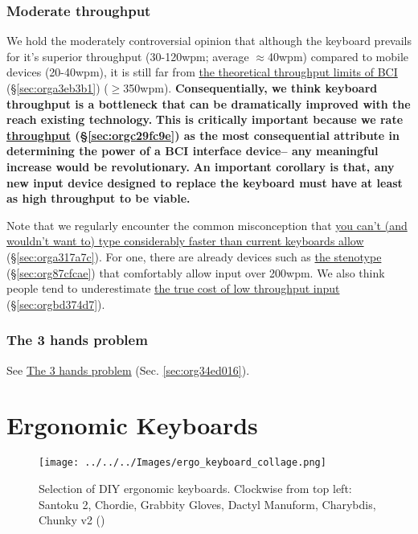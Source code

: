 \documentclass[logo,bsc,singlespacing,parskip]{infthesis}
\begin{document}
\subsubsection{Moderate throughput}
\label{sec:org878c419}
We hold the moderately controversial opinion that although the keyboard prevails for it's superior throughput (30-120wpm; average \(\approx\)40wpm) compared to mobile devices (20-40wpm), it is still far from \hyperref[sec:orga3eb3b1]{the theoretical throughput limits of BCI} (\S \ref{sec:orga3eb3b1}) (\(\ge\)350wpm).
\textbf{Consequentially, we think keyboard throughput is a bottleneck that can be dramatically improved with the reach existing technology.}
\textbf{This is critically important because we rate \hyperref[sec:orgc29fc9e]{throughput} (\S \ref{sec:orgc29fc9e}) as the most consequential attribute in determining the power of a BCI interface device-- any meaningful increase would be revolutionary.}
\textbf{An important corollary is that, any new input device designed to replace the keyboard must have at least as high throughput to be viable.}

Note that we regularly encounter the common misconception that \hyperref[sec:orga317a7c]{you can't (and wouldn't want to) type considerably faster than current keyboards allow} (\S \ref{sec:orga317a7c}).
For one, there are already devices such as \hyperref[sec:org87cfcae]{the stenotype} (\S \ref{sec:org87cfcae}) that comfortably allow input over 200wpm.
We also think people tend to underestimate \hyperref[sec:orgbd374d7]{the true cost of low throughput input} (\S \ref{sec:orgbd374d7}).

\subsubsection{The 3 hands problem}
\label{sec:orga06b2e2}
See \hyperref[sec:org34ed016]{The 3 hands problem} (Sec. \ref{sec:org34ed016}).

\section{Ergonomic Keyboards}
\label{sec:orgb70820d}
\begin{figure}[h]
\centering
\texttt{[image: ../../../Images/ergo\_keyboard\_collage.png]}
\caption[Collage of ergonomic keyboards]{\label{fig:ergo_collage}Selection of DIY ergonomic keyboards. Clockwise from top left: Santoku 2, Chordie, Grabbity Gloves, Dactyl Manuform, Charybdis, Chunky v2  (\autocite{ErgoMechBoards})}
\end{figure}
\end{document}
